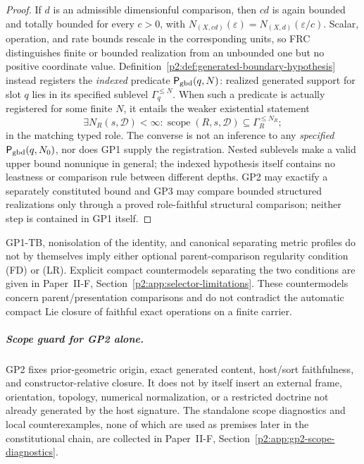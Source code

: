 \documentclass[12pt,a4paper]{article}
\begin{document}
\begin{proof}
If \(d\) is an admissible dimensionful comparison, then \(c d\) is again
bounded and totally bounded for every \(c>0\), with
\(N_{(X,cd)}(\varepsilon)=N_{(X,d)}(\varepsilon/c)\).  Scalar, operation, and
rate bounds rescale in the corresponding units, so FRC distinguishes finite
or bounded realization from an unbounded one but no positive coordinate
value.  Definition~\ref{p2:def:generated-boundary-hypothesis} instead
registers the \emph{indexed} predicate \(\mathsf P_{\rm gbd}(q,N)\):
realized generated support for slot \(q\) lies in its specified sublevel
\(\Gamma_q^{\le N}\).  When such a predicate is actually registered for
some finite \(N\), it entails the weaker existential statement
\[
 \exists N_R(s,\mathcal D)<\infty:
 \operatorname{scope}(R,s,\mathcal D)\subseteq\Gamma_R^{\le N_R};
\]
in the matching typed role.  The converse is not an inference to any
\emph{specified} \(\mathsf P_{\rm gbd}(q,N_0)\), nor does GP1 supply the
registration.  Nested sublevels make a valid upper bound nonunique in
general; the indexed hypothesis itself contains no leastness or comparison
rule between different depths.  GP2 may exactify a separately constituted
bound and GP3 may compare bounded structured realizations only through a
proved role-faithful structural comparison; neither step is contained in
GP1 itself.
\end{proof}

\begin{remark}
\label{p2:rem:gp1-regularity-countermodels-pointer}
GP1-TB, nonisolation of the identity, and canonical separating metric profiles
do not by themselves imply either optional parent-comparison regularity
condition (FD) or (LR).  Explicit compact countermodels separating the two
conditions are given in Paper~II-F, Section~\ref{p2:app:selector-limitations}.  These
countermodels concern parent/presentation comparisons and do not contradict the
automatic compact Lie closure of faithful exact operations on a finite carrier.
\end{remark}



\subparagraph{Scope guard for GP2 alone.}
GP2 fixes prior-geometric origin, exact generated content, host/sort
faithfulness, and constructor-relative closure.  It does not by itself insert
an external frame, orientation, topology, numerical normalization, or a
restricted doctrine not already generated by the host signature.  The
standalone scope diagnostics and local counterexamples, none of which are used
as premises later in the constitutional chain, are collected in
Paper~II-F, Section~\ref{p2:app:gp2-scope-diagnostics}.
\end{document}
